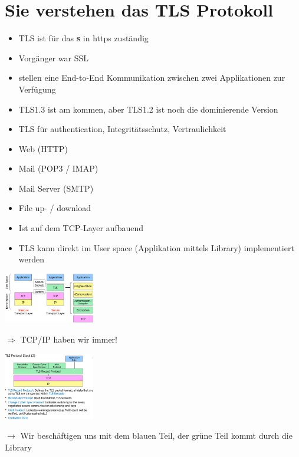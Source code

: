\documentclass{report}
\newenvironment{Figure}
	{\par\medskip\noindent\minipage{\linewidth}}
	{\endminipage\par\medskip}
\theoremstyle{definition}
\theoremstyle{example}
\begin{document}
\section{Sie verstehen das TLS Protokoll}

\begin{itemize}
	\item TLS ist für das \textbf{s} in https zuständig
	\item Vorgänger war SSL
	\item stellen eine End-to-End Kommunikation zwischen zwei Applikationen zur Verfügung
	\item TLS1.3 ist am kommen, aber TLS1.2 ist noch die dominierende Version
	\item TLS für authentication, Integritätsschutz, Vertraulichkeit
\end{itemize} 

\begin{itemize}
	\item Web (HTTP)
	\item Mail (POP3 / IMAP)
	\item Mail Server (SMTP)
	\item File up- / download
\end{itemize}

\begin{itemize}
	\item Ist auf dem TCP-Layer aufbauend
	\item TLS kann direkt im User space (Applikation mittels Library) implementiert werden

\end{itemize}

\begin{Figure}
\centering
\includegraphics[width=150px]{img/TLSProtocolStack.png}
	\label{fig:Abbildung des Protokoll Stacks in TLS}
\end{Figure}
$\Rightarrow$ TCP/IP haben wir immer!

\begin{Figure}
\centering
\includegraphics[width=150px]{img/TLSProtocolStackII.png}
	\label{fig:Abbildung des Protokoll Stacks in TLS}
\end{Figure}
$\rightarrow$ Wir beschäftigen uns mit dem blauen Teil, der grüne Teil kommt durch die Library
\end{document}
